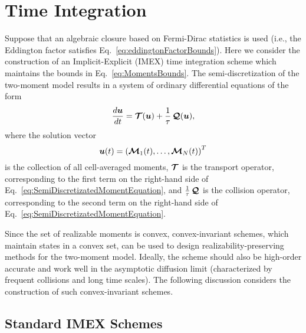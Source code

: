 \clearpage
\section{Time Integration} \label{se:TimeIntegration}

Suppose that an algebraic closure based on Fermi-Dirac statistics is used (i.e., the Eddington factor satisfies Eq.~\eqref{eq:eddingtonFactorBounds}).
Here we consider the construction of an Implicit-Explicit (IMEX) time integration scheme which maintains the bounds in Eq.~\eqref{eq:MomentsBounds}.  
The semi-discretization of the two-moment model results in a system of ordinary differential equations of the form
\begin{equation}
  \dfrac{d \boldsymbol{u}}{d t} = \boldsymbol{\mathcal{T}}(\boldsymbol{u}) + \frac{ 1}{\tau}\,\boldsymbol{\mathcal{Q}}(\boldsymbol{u}),
\end{equation}
where the solution vector
\begin{equation}
  \boldsymbol{u}(t) = \left( \boldsymbol{\mathcal{M}}_{1}(t),\ldots,\boldsymbol{\mathcal{M}}_{N}(t)\right) ^{T}
\end{equation}
is the collection of all cell-averaged moments, $\boldsymbol{\mathcal{T}}$ is the transport operator, corresponding to the first term on the right-hand side of Eq.~\eqref{eq:SemiDiscretizatedMomentEquation}, and $\frac{1}{\tau}\,\boldsymbol{\mathcal{Q}}$ is the collision operator, corresponding to the second term on the right-hand side of Eq.~\eqref{eq:SemiDiscretizatedMomentEquation}.  

Since the set of realizable moments is convex, convex-invariant schemes, which maintain states in a convex set, can be used to design realizability-preserving methods for the two-moment model. 
Ideally, the scheme should also be high-order accurate and work well in the asymptotic diffusion limit (characterized by frequent collisions and long time scales).  
The following discussion considers the construction of such convex-invariant schemes.  

\subsection{Standard IMEX Schemes}

